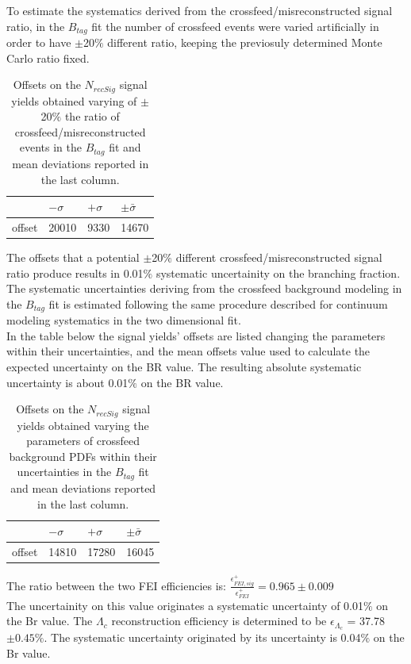 To estimate the systematics derived from the crossfeed/misreconstructed signal ratio, in the $B_{tag}$ fit the number of crossfeed events 
were varied artificially in order to have $\pm$20$\%$ different ratio, keeping the previosuly determined Monte Carlo ratio fixed.

\vspace{0.25 cm}
\begin{table}[H]
\begin{tabular}{ |p{2.5cm}||p{2cm}| p{2cm}|  p{2cm}|}
\hline
       &  $- \sigma$ &  $+ \sigma$ & $ \pm \bar{\sigma}$\\
 \hline
 offset    &  20010 &  9330 & 14670 \\
 \hline
\end{tabular}
\caption{Offsets on the $N_{recSig}$  signal yields obtained varying of $\pm$20$\%$ the 
 ratio of crossfeed/misreconstructed events in the $B_{tag}$ fit and mean deviations reported in the last column.}
\end{table}

The offsets that a potential $\pm$20$\%$ different crossfeed/misreconstructed signal ratio produce results in 0.01$\%$ systematic
uncertainity on the branching fraction.
\\
The systematic uncertainties deriving from the crossfeed background modeling in the $B_{tag}$ fit is estimated following 
the same procedure  described for continuum modeling systematics in the two dimensional fit.\\
In the table below the signal yields' offsets are listed changing
the parameters within their uncertainties, and the mean offsets value used to calculate the
expected uncertainty on the BR value. The resulting absolute systematic uncertainty is
about 0.01$\%$ on the BR value.
\vspace{0.25 cm}
\begin{table}[H]
\begin{tabular}{ |p{2.5cm}||p{2cm}| p{2cm}|  p{2cm}|}
\hline
       &  $- \sigma$ &  $+ \sigma$ & $ \pm \bar{\sigma}$\\
 \hline
 offset    &  14810 &  17280 & 16045 \\
 \hline
\end{tabular}
\caption{Offsets on the $N_{recSig}$  signal yields  obtained varying the parameters of crossfeed
background PDFs within their uncertainties in the $B_{tag}$ fit and mean
deviations reported in the last column. }
\end{table}

The ratio between the two FEI efficiencies is: 
 $\frac{\epsilon^{+}_{FEI,  sig}}{\epsilon^{+}_{FEI}} = 0.965 \pm 0.009 $ \\
\vspace{0.4 cm} 
 The uncertainity on this value originates a systematic uncertainty of 0.01$\%$ on the Br value.
The $\Lambda_c$ reconstruction efficiency is determined to be $\epsilon_{\Lambda_c}$ = 37.78 $\pm 0.45 \%$. 
The systematic uncertainty originated by its uncertainty is 0.04$\%$ on the Br value.\\

